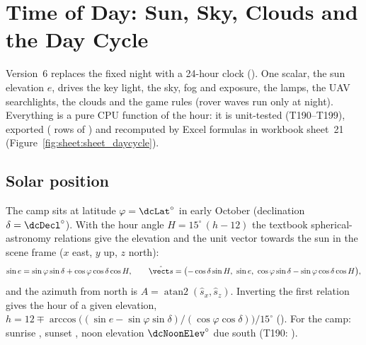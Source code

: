 \section{Time of Day: Sun, Sky, Clouds and the Day Cycle}\label{sec:daycycle}
Version~6 replaces the fixed night with a 24-hour clock (). One scalar, the sun elevation $e$, drives the key light, the sky, fog and exposure, the lamps, the UAV searchlights, the clouds and the game rules (rover waves run only at night). Everything is a pure CPU function of the hour: it is unit-tested (T190--T199), exported (\dcGridRows{} rows of ) and recomputed by Excel formulas in workbook sheet~21 (Figure~\ref{fig:sheet:sheet_daycycle}).

\subsection{Solar position}
The camp sits at latitude $\varphi=\dcLat^\circ$ in early October (declination $\delta=\dcDecl^\circ$). With the hour angle $H=15^\circ\,(h-12)$ the textbook spherical-astronomy relations give the elevation and the unit vector towards the sun in the scene frame ($x$ east, $y$ up, $z$ north):
\begin{equation}
\sin e=\sin\varphi\sin\delta+\cos\varphi\cos\delta\cos H,\qquad
\hat{\vect s}=\bigl(-\cos\delta\sin H,\ \sin e,\ \cos\varphi\sin\delta-\sin\varphi\cos\delta\cos H\bigr),
\end{equation}
and the azimuth from north is $A=\operatorname{atan2}(\hat s_x,\hat s_z)$. Inverting the first relation gives the hour of a given elevation, $h=12\mp\arccos\bigl((\sin e-\sin\varphi\sin\delta)/(\cos\varphi\cos\delta)\bigr)/15^\circ$ (). For the camp: sunrise \dcSunrise, sunset \dcSunset, noon elevation $\dcNoonElev^\circ$ due south (T190: ).
\lstSunDir

